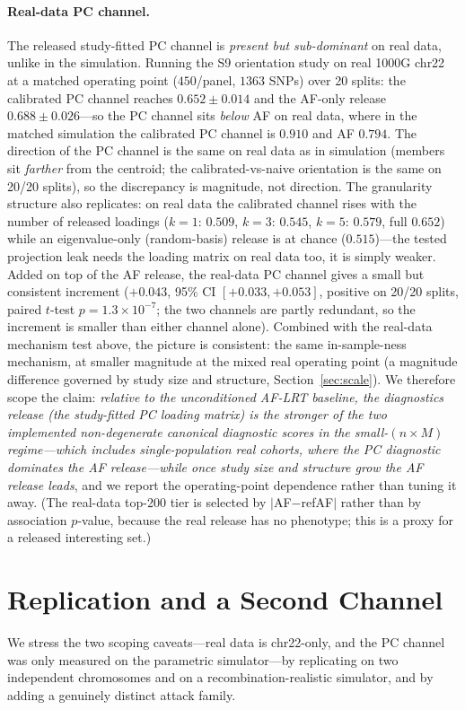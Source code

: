 \documentclass[11pt]{article}
\begin{document}
\paragraph{Real-data PC channel.} The released study-fitted PC channel is
\emph{present but sub-dominant} on real data, unlike in the simulation. Running
the S9 orientation study on real 1000G chr22 at a matched operating point
($450$/panel, $1363$ SNPs) over 20 splits: the calibrated PC channel reaches
$0.652 \pm 0.014$ and the AF-only release $0.688 \pm 0.026$---so the PC channel
sits \emph{below} AF on real data, where in the matched simulation the
calibrated PC channel is $0.910$ and AF $0.794$. The direction of the PC channel
is the same on real data as in simulation (members sit \emph{farther} from the
centroid; the calibrated-vs-naive orientation is the same on 20/20 splits), so
the discrepancy is magnitude, not direction. The granularity structure also
replicates: on real data the calibrated channel rises with the number of
released loadings ($k{=}1$: $0.509$, $k{=}3$: $0.545$, $k{=}5$: $0.579$, full
$0.652$) while an eigenvalue-only (random-basis) release is at chance
($0.515$)---the tested projection leak needs
the loading matrix on real data too, it is simply weaker. Added on top of the AF
release, the real-data PC channel gives a small but consistent increment
($+0.043$, 95\% CI $[+0.033,+0.053]$, positive on 20/20 splits, paired
$t$-test $p=1.3\times10^{-7}$; the two channels are partly redundant, so the
increment is smaller than either channel alone). Combined with the real-data
mechanism test above, the picture is consistent: the same in-sample-ness
mechanism, at smaller magnitude at the mixed real operating point (a magnitude
difference governed by study size and structure, Section~\ref{sec:scale}). We
therefore scope the claim: \emph{relative to the unconditioned AF-LRT baseline,
the diagnostics release (the study-fitted PC
loading matrix) is the stronger of the two implemented non-degenerate canonical
diagnostic scores in the small-$(n{\times}M)$ regime---which
includes single-population real cohorts, where the PC diagnostic dominates the
AF release---while once study size and structure grow the AF release leads}, and
we report the operating-point dependence rather than tuning it away.
(The real-data top-200 tier is selected by
$|$AF$-$refAF$|$ rather than by association $p$-value, because the real release
has no phenotype; this is a proxy for a released interesting set.)

\section{Replication and a Second Channel}
\label{sec:replication}
We stress the two scoping caveats---real data is chr22-only, and the PC channel
was only measured on the parametric simulator---by replicating on two
independent chromosomes and on a recombination-realistic simulator, and by
adding a genuinely distinct attack family.
\end{document}
